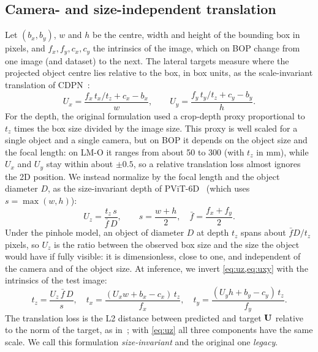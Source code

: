 \subsection{Camera- and size-independent translation}
\label{sec:method:translation}
Let $(b_x, b_y)$, $w$ and $h$ be the centre, width and height of the bounding box in pixels, and
$f_x, f_y, c_x, c_y$ the intrinsics of the image, which on BOP change from one image (and dataset)
to the next. The lateral targets measure where the projected object centre lies relative to the
box, in box units, as the scale-invariant translation of CDPN~\cite{li2019cdpn}:
\begin{equation}
  U_x = \frac{f_x \, t_x / t_z + c_x - b_x}{w}, \qquad
  U_y = \frac{f_y \, t_y / t_z + c_y - b_y}{h}.
  \label{eq:uxy}
\end{equation}
For the depth, the original formulation used a crop-depth proxy proportional to $t_z$ times the
box size divided by the image size. This proxy is well scaled for a single object and a single
camera, but on BOP it depends on the object size and the focal length: on LM-O it ranges from
about 50 to 300 (with $t_z$ in mm), while $U_x$ and $U_y$ stay within about $\pm 0.5$, so a
relative translation loss almost ignores the 2D position. We instead normalize by the focal length
and the object diameter $D$, as the size-invariant depth of PViT-6D~\cite{stapf2023pvit6d}
(which uses $s = \max(w, h)$):
\begin{equation}
  U_z = \frac{t_z \, s}{\bar f \, D}, \qquad s = \frac{w + h}{2}, \quad
  \bar f = \frac{f_x + f_y}{2}.
  \label{eq:uz}
\end{equation}
Under the pinhole model, an object of diameter $D$ at depth $t_z$ spans about $\bar f D / t_z$
pixels, so $U_z$ is the ratio between the observed box size and the size the object would have if
fully visible: it is dimensionless, close to one, and independent of the camera and of the object
size. At inference, we invert \cref{eq:uz,eq:uxy} with the intrinsics of the test image:
\begin{equation}
  t_z = \frac{U_z \, \bar f \, D}{s}, \quad
  t_x = \frac{(U_x w + b_x - c_x)\, t_z}{f_x}, \quad
  t_y = \frac{(U_y h + b_y - c_y)\, t_z}{f_y}.
  \label{eq:inverse}
\end{equation}
The translation loss is the L2 distance between predicted and target $\mathbf{U}$ relative to the norm of
the target, as in~\cite{ancey2026fastposevit}; with \cref{eq:uz} all three components have the
same scale. We call this formulation \emph{size-invariant} and the original one \emph{legacy}.

